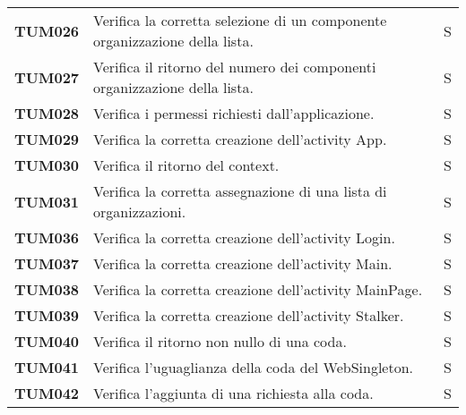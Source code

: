 \documentclass[../../piano-di-qualifica.tex]{subfiles}
\begin{document}
\begin{longtable}[H]{>{\centering\bfseries}m{3cm} >{}m{10cm} >{\centering\arraybackslash}m{3cm}}
  TUM026             & Verifica la corretta selezione di un componente organizzazione della lista. & S\\ %

  TUM027             & Verifica il ritorno del numero dei componenti organizzazione della lista. & S\\ %

  TUM028             & Verifica i permessi richiesti dall'applicazione. & S\\ %



  TUM029             & Verifica la corretta creazione dell'activity App. & S\\ %

  TUM030             & Verifica il ritorno del context. & S\\ %

  TUM031             & Verifica la corretta assegnazione di una lista di organizzazioni. & S\\ %


  TUM036             & Verifica la corretta creazione dell'activity Login. & S\\ %

  TUM037             & Verifica la corretta creazione dell'activity Main. & S\\ %

  TUM038             & Verifica la corretta creazione dell'activity MainPage. & S\\ %

  TUM039             & Verifica la corretta creazione dell'activity Stalker. & S\\ %

  TUM040             & Verifica il ritorno non nullo di una coda. & S\\ %

  TUM041             & Verifica l'uguaglianza della coda del WebSingleton. & S\\ %

  TUM042             & Verifica l'aggiunta di una richiesta alla coda. & S\\ %


\end{longtable}
\end{document}
